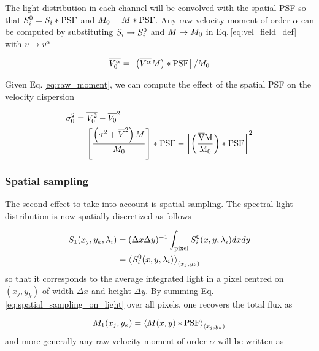 The light distribution in each channel will be convolved with the spatial PSF so that $S_i^{\rm{0}} = S_i * \rm{PSF}$ and $M_{\rm{0}} = M * \rm{PSF}$. Any raw velocity moment of order $\alpha$ can be computed by substituting $S_i \rightarrow S_i^{\rm{0}}$ and $M \rightarrow M_{\rm{0}}$ in Eq.\,\ref{eq:vel_field_def} with $v \rightarrow v^{\alpha}$

\begin{equation}
	\overline{V_0^{\alpha}} = \left [ \left ( \overline{V^{\alpha}} M \right ) * \rm{PSF} \right ] / M_0
	\label{eq:raw_moment}
\end{equation}

Given Eq.\,\ref{eq:raw_moment}, we can compute the effect of the spatial PSF on the velocity dispersion

\begin{align}
	\sigma_0^2 & = \overline{V_0^2} - \overline{V_0}^2 \\
	& = \left [ \frac{\left ( \sigma^2 + \overline{V}^2 \right ) M}{M_0} \right ] * \rm{PSF} - \left [ \left (  \frac{\overline{V} M}{ M_0} \right ) * \rm{PSF} \right ]^2
\end{align}

\subsubsection{Spatial sampling}
\label{sec:spatial_sampling}

The second effect to take into account is spatial sampling. The spectral light distribution is now spatially discretized as follows

\begin{align}
	S_1 ( x_j , y_k , \lambda_i ) & = (\Delta x \Delta y)^{-1}\int_{\rm{pixel}} S_i^0 (x, y, \lambda_i) dx dy \\
	& = \left \langle S_i^0 (x, y, \lambda_i) \right \rangle_{(x_j , y_k)}
	\label{eq:spatial_sampling_on_light}
\end{align}
so that it corresponds to the average integrated light in a pixel centred on $(x_j , y_k)$ of width $\Delta x$ and height $\Delta y$. By summing Eq.\,\ref{eq:spatial_sampling_on_light} over all pixels, one recovers the total flux as

\begin{equation}
	M_1 (x_j , y_k ) = \left \langle M (x,y) * {\rm{PSF}} \right \rangle_{(x_j , y_k)}
\end{equation}
and more generally any raw velocity moment of order $\alpha$ will be written as

